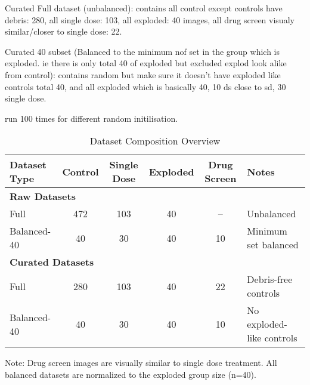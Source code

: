 Curated Full dataset (unbalanced): contains all control except controls have debris: 280, all single dose: 103, all exploded: 40 images, all drug screen visualy 
similar/closer to single dose: 22.

Curated 40 subset  (Balanced to the minimum nof set in the group which is exploded. ie there is only total 40 of exploded but excluded explod look alike from control):
contains random but make sure it doesn't have exploded like controls total 40, and all exploded which is basically 40, 10 ds close to sd, 30 single dose.

run 100 times for different random initilisation.

\begin{table}[htbp]
    \centering
    \caption{Dataset Composition Overview}
    \begin{tabular}{lccccl}
    \toprule
    Dataset Type & Control & Single Dose & Exploded & Drug Screen & Notes \\
    \midrule
    \multicolumn{6}{l}{\textbf{Raw Datasets}} \\
    \midrule
    Full & 472 & 103 & 40 & -- & Unbalanced \\
    Balanced-40 & 40 & 30 & 40 & 10 & Minimum set balanced \\
    \midrule
    \multicolumn{6}{l}{\textbf{Curated Datasets}} \\
    \midrule
    Full & 280 & 103 & 40 & 22 & Debris-free controls \\
    Balanced-40 & 40 & 30 & 40 & 10 & No exploded-like controls \\
    \bottomrule
    \end{tabular}
    \begin{flushleft}
    \small
    Note: Drug screen images are visually similar to single dose treatment. All balanced datasets are normalized to the exploded group size (n=40).
    \end{flushleft}
    \end{table}


